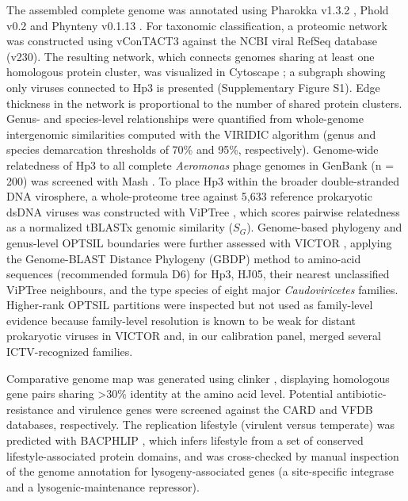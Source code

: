 The assembled complete genome was annotated using Pharokka v1.3.2
\citep{2022-Pharokka_Bouras}, Phold v0.2 \citep{2026-Protein_Bouras} and
Phynteny v0.1.13 \citep{2024-Susiegriggo_SusieGrigson}. For taxonomic
classification, a proteomic network was constructed using vConTACT3 \citep{2025-Machine_Bolduc} against the NCBI viral RefSeq database (v230). The resulting network, which connects
genomes sharing at least one homologous protein cluster, was visualized
in Cytoscape \citep{2003-Cytoscape_Shannon}; a subgraph showing only
viruses connected to Hp3 is presented (Supplementary Figure S1).
Edge thickness in the network is proportional to the number of shared
protein clusters. Genus- and species-level relationships were quantified
from whole-genome intergenomic similarities computed with the VIRIDIC
algorithm \citep{2020-VIRIDIC_Moraru} (genus and species demarcation
thresholds of 70\% and 95\%, respectively). Genome-wide relatedness of
Hp3 to all complete \emph{Aeromonas} phage genomes in GenBank (n = 200)
was screened with Mash \citep{2016-Mash_Ondov}. To place Hp3 within the
broader double-stranded DNA virosphere, a whole-proteome tree against
5,633 reference prokaryotic dsDNA viruses was constructed with ViPTree
\citep{2017-ViPTree_Nishimura}, which scores pairwise relatedness as a
normalized tBLASTx genomic similarity (\(S_G\)). Genome-based phylogeny
and genus-level OPTSIL boundaries were further assessed with VICTOR
\citep{2017-VICTOR_Meier-Kolthoff}, applying the Genome-BLAST Distance
Phylogeny (GBDP) method to amino-acid sequences (recommended formula D6)
for Hp3, HJ05, their nearest unclassified ViPTree neighbours, and the
type species of eight major \emph{Caudoviricetes} families. Higher-rank
OPTSIL partitions were inspected but not used as family-level evidence
because family-level resolution is known to be weak for distant
prokaryotic viruses in VICTOR and, in our calibration panel, merged
several ICTV-recognized families.

Comparative
genome map was generated using clinker \citep{2021-Clinker_Gilchrist},
displaying homologous gene pairs sharing \textgreater30\% identity at
the amino acid level. Potential antibiotic-resistance and virulence
genes were screened against the CARD \citep{2020-CARD_Alcock} and VFDB
\citep{2019-VFDB_Liu} databases, respectively. The replication lifestyle
(virulent versus temperate) was predicted with BACPHLIP
\citep{2021-BACPHLIP_Hockenberry}, which infers lifestyle from a set of
conserved lifestyle-associated protein domains, and was cross-checked by
manual inspection of the genome annotation for lysogeny-associated genes
(a site-specific integrase and a lysogenic-maintenance repressor).

